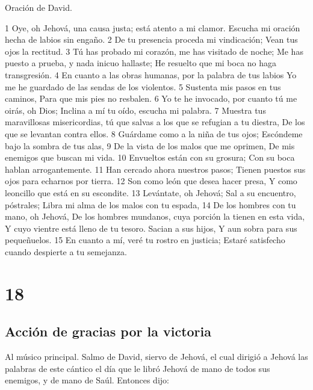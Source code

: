 Oración de David.

1 Oye, oh Jehová, una causa justa; está atento a mi clamor.
Escucha mi oración hecha de labios sin engaño.
2 De tu presencia proceda mi vindicación;
Vean tus ojos la rectitud.
3 Tú has probado mi corazón, me has visitado de noche;
Me has puesto a prueba, y nada inicuo hallaste;
He resuelto que mi boca no haga transgresión.
4 En cuanto a las obras humanas, por la palabra de tus labios
Yo me he guardado de las sendas de los violentos.
5 Sustenta mis pasos en tus caminos,
Para que mis pies no resbalen.
6 Yo te he invocado, por cuanto tú me oirás, oh Dios;
Inclina a mí tu oído, escucha mi palabra.
7 Muestra tus maravillosas misericordias, tú que salvas a los que se refugian a tu diestra,
De los que se levantan contra ellos.
8 Guárdame como a la niña de tus ojos;
Escóndeme bajo la sombra de tus alas,
9 De la vista de los malos que me oprimen,
De mis enemigos que buscan mi vida.
10 Envueltos están con su grosura;
Con su boca hablan arrogantemente.
11 Han cercado ahora nuestros pasos;
Tienen puestos sus ojos para echarnos por tierra.
12 Son como león que desea hacer presa,
Y como leoncillo que está en su escondite.
13 Levántate, oh Jehová;
Sal a su encuentro, póstrales;
Libra mi alma de los malos con tu espada,
14 De los hombres con tu mano, oh Jehová,
De los hombres mundanos, cuya porción la tienen en esta vida,
Y cuyo vientre está lleno de tu tesoro.
Sacian a sus hijos,
Y aun sobra para sus pequeñuelos.
15 En cuanto a mí, veré tu rostro en justicia;
Estaré satisfecho cuando despierte a tu semejanza.

\chapter{18}

\section*{Acción de gracias por la victoria}

Al músico principal. Salmo de David, siervo de Jehová, el cual dirigió a Jehová las palabras de este cántico el día que le libró Jehová de mano de todos sus enemigos, y de mano de Saúl. Entonces dijo:

